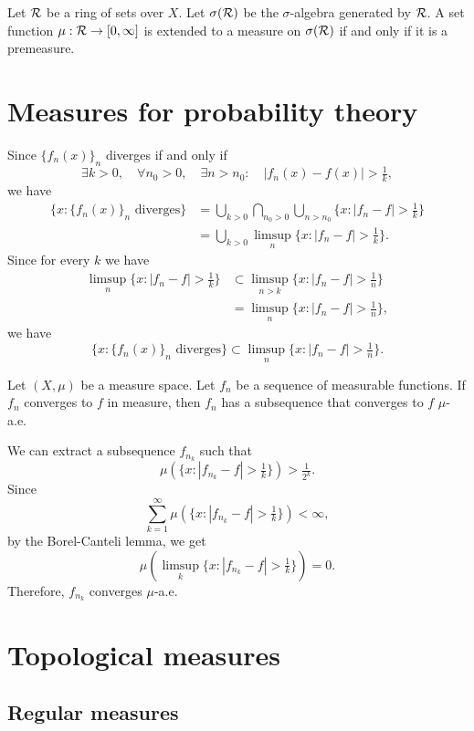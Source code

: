 \documentclass{../exp}
\begin{document}
\begin{thm}
Let $\mathcal{R}$ be a ring of sets over $X$.
Let $\sigma(\mathcal{R})$ be the $\sigma$-algebra generated by $\mathcal{R}$.
A set function $\mu:\cR\to[0,\oo]$ is extended to a measure on $\sigma(\mathcal{R})$ if and only if it is a premeasure.
\end{thm}


\section{Measures for probability theory}

Since $\{f_n(x)\}_n$ diverges if and only if
\[\exists k>0,\quad\forall n_0>0,\quad\exists n>n_0:\quad|f_n(x)-f(x)|>\tfrac1k,\]
we have
\begin{align*}
\{x:\{f_n(x)\}_n\text{ diverges}\}
&=\bigcup_{k>0}\bigcap_{n_0>0}\bigcup_{n>n_0}\{x:|f_n-f|>\tfrac1k\}\\
&=\bigcup_{k>0}\limsup_n\{x:|f_n-f|>\tfrac1k\}.
\end{align*}
Since for every $k$ we have
\begin{align*}
\limsup_n\{x:|f_n-f|>\tfrac1k\}
&\subset\limsup_{n>k}\{x:|f_n-f|>\tfrac1n\}\\
&=\limsup_n\{x:|f_n-f|>\tfrac1n\},
\end{align*}
we have
\[\{x:\{f_n(x)\}_n\text{ diverges}\}\subset\limsup_n\{x:|f_n-f|>\tfrac1n\}.\]




\begin{thm}
Let $(X,\mu)$ be a measure space.
Let $f_n$ be a sequence of measurable functions.
If $f_n$ converges to $f$ in measure, then $f_n$ has a subsequence that converges to $f$ $\mu$-a.e.
\end{thm}
\begin{pf}
We can extract a subsequence $f_{n_k}$ such that
\[\mu(\{x:|f_{n_k}-f|>\tfrac1k\})>\tfrac1{2^k}.\]
Since
\[\sum_{k=1}^\infty\mu(\{x:|f_{n_k}-f|>\tfrac1k\})<\infty,\]
by the Borel-Canteli lemma, we get
\[\mu(\limsup_k\{x:|f_{n_k}-f|>\tfrac1k\})=0.\]
Therefore, $f_{n_k}$ converges $\mu$-a.e.
\end{pf}




\section{Topological measures}

\subsection{Regular measures}
\end{document}
